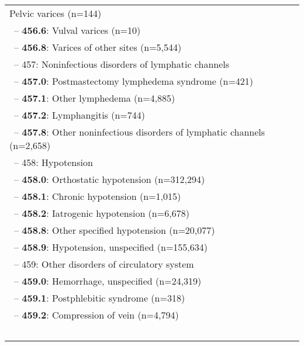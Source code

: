 \begin{longtable}{p{\textwidth}}
Pelvic varices (n=144)} \\ \-\ \hspace{30pt}\footnotesize{-- {\color{ForestGreen} \textbf{456.6}}: Vulval varices (n=10)} \\ \-\ \hspace{30pt}\footnotesize{-- {\color{ForestGreen} \textbf{456.8}}: Varices of other sites (n=5,544)} \\ \-\ \hspace{20pt}\footnotesize{-- 457: Noninfectious disorders of lymphatic channels} \\ \-\ \hspace{30pt}\footnotesize{-- {\color{ForestGreen} \textbf{457.0}}: Postmastectomy lymphedema syndrome (n=421)} \\ \-\ \hspace{30pt}\footnotesize{-- {\color{ForestGreen} \textbf{457.1}}: Other lymphedema (n=4,885)} \\ \-\ \hspace{30pt}\footnotesize{-- {\color{ForestGreen} \textbf{457.2}}: Lymphangitis (n=744)} \\ \-\ \hspace{30pt}\footnotesize{-- {\color{ForestGreen} \textbf{457.8}}: Other noninfectious disorders of lymphatic channels (n=2,658)} \\ \-\ \hspace{20pt}\footnotesize{-- 458: Hypotension} \\ \-\ \hspace{30pt}\footnotesize{-- {\color{ForestGreen} \textbf{458.0}}: Orthostatic hypotension (n=312,294)} \\ \-\ \hspace{30pt}\footnotesize{-- {\color{ForestGreen} \textbf{458.1}}: Chronic hypotension (n=1,015)} \\ \-\ \hspace{30pt}\footnotesize{-- {\color{ForestGreen} \textbf{458.2}}: Iatrogenic hypotension (n=6,678)} \\ \-\ \hspace{30pt}\footnotesize{-- {\color{ForestGreen} \textbf{458.8}}: Other specified hypotension (n=20,077)} \\ \-\ \hspace{30pt}\footnotesize{-- {\color{ForestGreen} \textbf{458.9}}: Hypotension, unspecified (n=155,634)} \\ \-\ \hspace{20pt}\footnotesize{-- 459: Other disorders of circulatory system} \\ \-\ \hspace{30pt}\footnotesize{-- {\color{ForestGreen} \textbf{459.0}}: Hemorrhage, unspecified (n=24,319)} \\ \-\ \hspace{30pt}\footnotesize{-- {\color{ForestGreen} \textbf{459.1}}: Postphlebitic syndrome (n=318)} \\ \-\ \hspace{30pt}\footnotesize{-- {\color{ForestGreen} \textbf{459.2}}: Compression of vein (n=4,794)} \\ \-\ \hspace{30pt}\footnotesize{-- 
\end{longtable}
